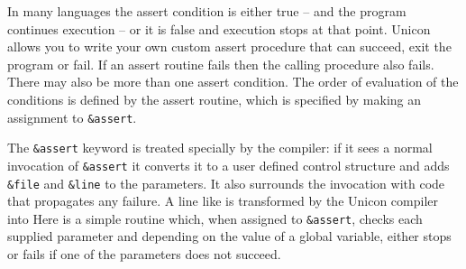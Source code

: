  In many languages the assert condition is either true -- and the program
 continues execution -- or it is false and execution stops at that point.
 Unicon allows you to write your own custom assert procedure that can
 succeed, exit the program or fail.  If an assert routine fails then the
 calling procedure also fails. There may also be more than one assert
 condition.  The order of evaluation of the conditions is defined by the
 assert routine, which is specified by making an assignment to
 \texttt{\&assert}.

 The \texttt{\&assert} keyword is treated specially by the compiler: if it
 sees a normal invocation of \texttt{\&assert} it converts it to a user
 defined control structure and adds \texttt{\&file} and \texttt{\&line} to
 the parameters. It also surrounds the invocation with code that propagates
 any failure. A line like
\noindent is transformed by the Unicon compiler into
\noindent
Here is a simple routine which, when assigned to \texttt{\&assert}, checks
each supplied parameter and depending on the value of a global variable,
either stops or fails if one of the parameters does not succeed.



